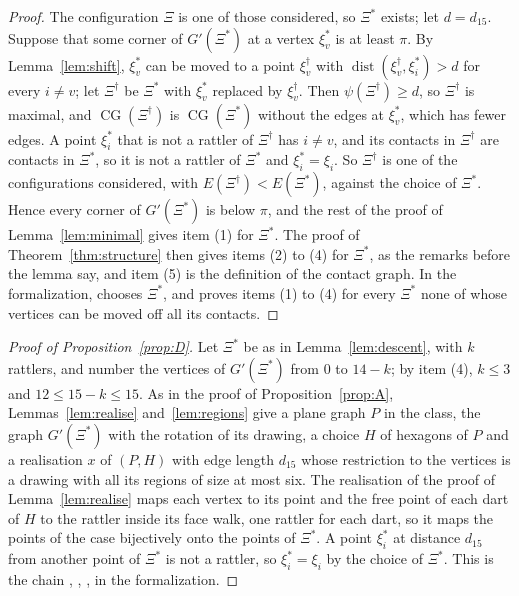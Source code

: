 \documentclass[12pt]{amsart}
\theoremstyle{definition}
\theoremstyle{plain}
\theoremstyle{definition}
\newcommand{\dist}{\operatorname{dist}}
\newcommand{\CG}{\operatorname{CG}}
\begin{document}
\begin{proof}
The configuration $\Xi$ is one of those considered, so $\Xi^*$ exists; let $d=d_{15}$. Suppose that some corner of $G'(\Xi^*)$ at a vertex $\xi^*_v$ is at least $\pi$. By Lemma~\ref{lem:shift}, $\xi^*_v$ can be moved to a point $\xi^\dagger_v$ with $\dist(\xi^\dagger_v,\xi^*_i)>d$ for every $i\ne v$; let $\Xi^\dagger$ be $\Xi^*$ with $\xi^*_v$ replaced by $\xi^\dagger_v$. Then $\psi(\Xi^\dagger)\ge d$, so $\Xi^\dagger$ is maximal, and $\CG(\Xi^\dagger)$ is $\CG(\Xi^*)$ without the edges at $\xi^*_v$, which has fewer edges. A point $\xi^*_i$ that is not a rattler of $\Xi^\dagger$ has $i\ne v$, and its contacts in $\Xi^\dagger$ are contacts in $\Xi^*$, so it is not a rattler of $\Xi^*$ and $\xi^*_i=\xi_i$. So $\Xi^\dagger$ is one of the configurations considered, with $E(\Xi^\dagger)<E(\Xi^*)$, against the choice of $\Xi^*$. Hence every corner of $G'(\Xi^*)$ is below $\pi$, and the rest of the proof of Lemma~\ref{lem:minimal} gives item (1) for $\Xi^*$. The proof of Theorem~\ref{thm:structure} then gives items (2) to (4) for $\Xi^*$, as the remarks before the lemma say, and item (5) is the definition of the contact graph. In the formalization,  chooses $\Xi^*$, and  proves items (1) to (4) for every $\Xi^*$ none of whose vertices can be moved off all its contacts.
\end{proof}

\begin{proof}[Proof of Proposition~\ref{prop:D}]
Let $\Xi^*$ be as in Lemma~\ref{lem:descent}, with $k$ rattlers, and number the vertices of $G'(\Xi^*)$ from $0$ to $14-k$; by item (4), $k\le3$ and $12\le15-k\le15$. As in the proof of Proposition~\ref{prop:A}, Lemmas~\ref{lem:realise} and~\ref{lem:regions} give a plane graph $P$ in the class, the graph $G'(\Xi^*)$ with the rotation of its drawing, a choice $H$ of hexagons of $P$ and a realisation $x$ of $(P,H)$ with edge length $d_{15}$ whose restriction to the vertices is a drawing with all its regions of size at most six. The realisation of the proof of Lemma~\ref{lem:realise} maps each vertex to its point and the free point of each dart of $H$ to the rattler inside its face walk, one rattler for each dart, so it maps the points of the case bijectively onto the points of $\Xi^*$. A point $\xi^*_i$ at distance $d_{15}$ from another point of $\Xi^*$ is not a rattler, so $\xi^*_i=\xi_i$ by the choice of $\Xi^*$. This is the chain , , ,  in the formalization.
\end{proof}
\end{document}
